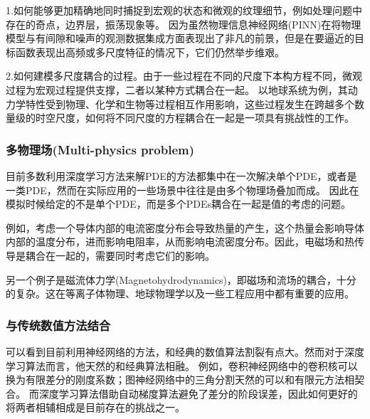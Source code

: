 1.如何能够更加精确地同时捕捉到宏观的状态和微观的纹理细节，例如处理问题中存在的奇点，边界层，振荡现象等。
因为虽然物理信息神经网络(PINN)在将物理模型与有间隙和噪声的观测数据集成方面表现出了非凡的前景，但是在要逼近的目标函数表现出高频或多尺度特征的情况下，它们仍然举步维艰。

2.如何建模多尺度耦合的过程。由于一些过程在不同的尺度下本构方程不同，微观过程为宏观过程提供支撑，二者以某种方式耦合在一起。
以地球系统为例，其动力学特性受到物理、化学和生物等过程相互作用影响，这些过程发生在跨越多个数量级的时空尺度，如何将不同尺度的方程耦合在一起是一项具有挑战性的工作。


\subsubsection{多物理场(Multi-physics problem)}
目前多数利用深度学习方法来解PDE的方法都集中在一次解决单个PDE，或者是一类PDE，然而在实际应用的一些场景中往往是由多个物理场叠加而成。
因此在模拟时候给定的不是单个PDE，而是多个PDEs耦合在一起是值的考虑的问题。

例如，考虑一个导体内部的电流密度分布会导致热量的产生，这个热量会影响导体内部的温度分布，进而影响电阻率，从而影响电流密度分布。因此，电磁场和热传导是耦合在一起的，需要同时考虑它们的影响。

另一个例子是磁流体力学(Magnetohydrodynamics)，即磁场和流场的耦合，十分的复杂。这在等离子体物理、地球物理学以及一些工程应用中都有重要的应用。

\subsubsection{与传统数值方法结合}
可以看到目前利用神经网络的方法，和经典的数值算法割裂有点大。然而对于深度学习算法而言，他天然的和经典算法相融。
例如，卷积神经网络中的卷积核可以换为有限差分的刚度系数；图神经网络中的三角分割天然的可以和有限元方法相契合。
而深度学习算法借助自动梯度算法避免了差分的阶段误差，因此如何更好的将两者相辅相成是目前存在的挑战之一。

\newpage

% 
% 

\begingroup
    \printbibliography[title={参考文献}]
\endgroup
